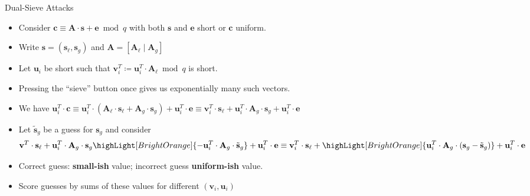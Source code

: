\documentclass[xcolor=table,10pt,aspectratio=169]{beamer}
\renewcommand{\vec}[1]{\ensuremath{\mathbf{#1}}\xspace}
\providecommand{\mat}[1]{\ensuremath{\vec{#1}}\xspace}
\begin{document}
\begin{frame}[label={sec:org65f3a5c}]{Dual-Sieve Attacks}
\begin{itemize}
\item Consider \(\vec{c} \equiv \mat{A} \cdot \vec{s} + \vec{e} \bmod q\) with both \(\vec{s}\) and \(\vec{e}\) short or \(\vec{c}\) uniform.
\item Write \(\vec{s} = (\vec{s}_{\ell}, \vec{s}_{g})\) and \(\mat{A} = [\mat{A}_{\ell} \mid \mat{A}_{g}]\)
\item Let \(\vec{u}_{i}\) be short such that \(\vec{v}_i^{T} \coloneqq \vec{u}_i^{T} \cdot \mat{A}_{\ell} \bmod q\)  is short.
\item Pressing the ``sieve'' button once gives us exponentially many such vectors.
\item We have
\(
\vec{u}_i^{T} \cdot \vec{c}
\equiv \vec{u}_i^{T} \cdot (\vec{A}_{\ell} \cdot \vec{s}_{\ell} + \vec{A}_{g} \cdot \vec{s}_{g})  + \vec{u}_i^{T} \cdot \vec{e}
\equiv \vec{v}_i^{T} \cdot \vec{s}_{\ell} + \vec{u}_i^{T} \cdot \vec{A}_{g} \cdot \vec{s}_{g} +  \vec{u}_i^{T}\cdot \vec{e}
\)
\item Let \(\tilde{\vec{s}}_{g}\) be a guess for \(\vec{s}_{g}\) and consider
  \[
  \vec{v}^{T} \cdot \vec{s}_{\ell} + \vec{u}_i^{T} \cdot \vec{A}_{g} \cdot \vec{s}_{g} \highLight[BrightOrange]{- \vec{u}_i^{T} \cdot \vec{A}_{g} \cdot \tilde{\vec{s}}_{g}} + \vec{u}_i^{T}\cdot \vec{e}
  \equiv \vec{v}_i^{T} \cdot \vec{s}_{\ell}
  + \highLight[BrightOrange]{\vec{u}_i^{T} \cdot \vec{A}_{g} \cdot \left(\vec{s}_{g} - \tilde{\vec{s}}_{g}\right)}
  + \vec{u}_i^{T}\cdot \vec{e}
\]\vspace{-\baselineskip}
\item Correct guess: \textbf{small-ish} value; incorrect guess \textbf{uniform-ish} value.
\item Score guesses by sums of these values for different \((\vec{v}_i, \vec{u}_i)\)
\end{itemize}
\end{frame}
\end{document}
